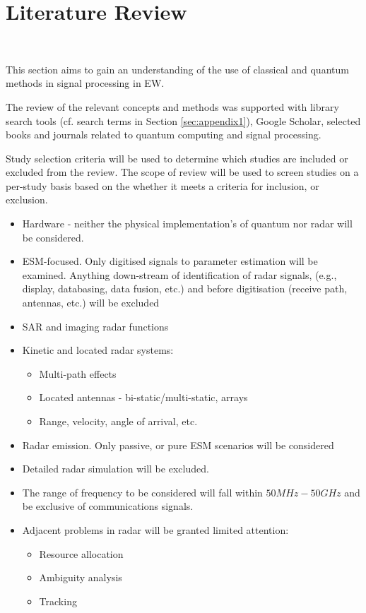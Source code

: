 \section{Literature Review}~\label{sec:literature}

This section aims to gain an understanding of the use of classical and quantum methods in signal processing in \ac{EW}.

The review of the relevant concepts and methods was supported with library search tools (cf. search terms in Section \ref{sec:appendix1}), Google Scholar, selected books and journals related to quantum computing and signal processing. 

Study selection criteria will be used to determine which studies are included or excluded from the review.
The scope of review will be used to screen studies on a per-study basis based on the whether it meets a criteria for inclusion, or exclusion.

\begin{itemize}
    \item Hardware - neither the physical implementation's of quantum nor radar will be considered.
    \item \ac{ESM}-focused. Only digitised signals to parameter estimation will be examined. Anything down-stream of identification of radar signals, (e.g., display, databasing, data fusion, etc.) and before digitisation (receive path, antennas, etc.) will be excluded
    \item \ac{SAR} and imaging radar functions
    \item Kinetic and located radar systems:
    \begin{itemize}
        \item Multi-path effects
        \item Located antennas - bi-static/multi-static, arrays
        \item Range, velocity, angle of arrival, etc.
    \end{itemize}
    \item Radar emission. Only passive, or pure \ac{ESM} scenarios will be considered
    \item Detailed radar simulation will be excluded.
    \item The range of frequency to be considered will fall within \(50MHz - 50GHz\) and be exclusive of communications signals.
    \item Adjacent problems in radar will be granted limited attention:
    \begin{itemize}
        \item Resource allocation
        \item Ambiguity analysis
        \item Tracking
    \end{itemize}
\end{itemize}

